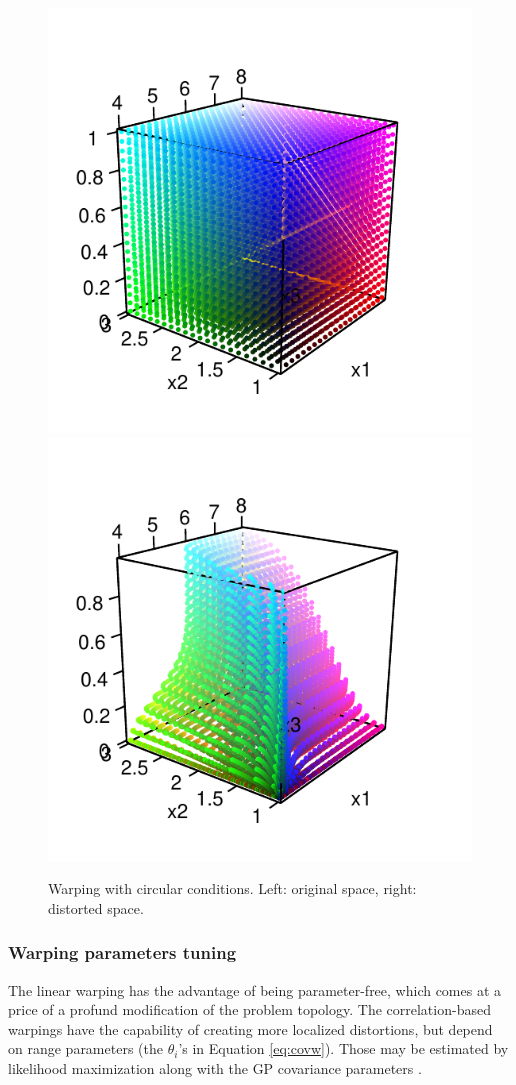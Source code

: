  \begin{figure}[!ht]
 \centering
 \includegraphics[width=.4\textwidth]{def3Dcirc1.pdf}
 \includegraphics[width=.4\textwidth]{def3Dcirc2.pdf}
 \caption{Warping with circular conditions. Left: original space, right: distorted space.}\label{fig:def3Dcirc}
\end{figure}

% 
% 
% 

\subsubsection{Warping parameters tuning}
The linear warping has the advantage of being parameter-free, which comes at a price of a profund modification of the 
problem topology. The correlation-based warpings have the capability of creating more localized distortions, but depend 
on range parameters (the $\theta_i$'s in Equation \ref{eq:covw}). Those may be estimated by likelihood maximization
along with the GP covariance parameters \cite{snoek2014input,marmin2018warped}.

